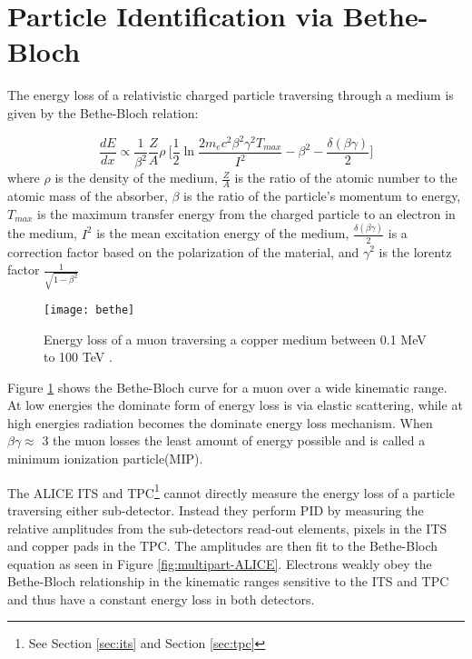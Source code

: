 \section{Particle Identification via Bethe-Bloch}\label{ref:pid}


The energy loss of a relativistic charged particle traversing through a medium is given by the Bethe-Bloch relation:

\begin{equation}
\frac{dE}{dx} \propto \frac{1}{\beta^{2}} \frac{Z}{A} \rho \  \bigg[ \frac{1}{2} \ln \frac{2 m_{e} c^{2} \beta^{2} \gamma^{2} T_{max}}{I^{2}} - \beta^{2} - \frac{\delta \left( \beta \gamma \right) }{2} \bigg]
\end{equation}
\noindent
where $\rho$ is the density of the medium, $\frac{Z}{A}$ is the ratio of the atomic number to the atomic mass of the absorber, $\beta$ is the ratio of the particle's momentum to energy, $T_{max}$ is the maximum transfer energy from the charged particle to an electron in the medium,  $I^{2}$ is the mean excitation energy of the medium, $\frac{\delta \left( \beta \gamma \right) }{2}$ is a correction factor based on the polarization of the material, and $\gamma^{2}$ is the lorentz factor $\frac{1}{\sqrt{1-\beta^{2}}}$

\begin{figure}[h]
\texttt{[image: bethe]}
\centering
\caption{ Energy loss of a muon traversing a copper medium between 0.1 MeV to 100 TeV \cite{Patrignani:2016xqp}.}
\label{fig:rawBB}
\end{figure}

Figure \ref{fig:rawBB} shows the Bethe-Bloch curve for a muon over a wide kinematic range.  At low energies the dominate form of energy loss is via elastic scattering, while at high energies radiation becomes the dominate energy loss mechanism. When $\beta \gamma \approx$ 3 the muon losses the least amount of energy possible and is called a minimum ionization particle(MIP).  

The ALICE ITS and TPC\footnote{See Section \ref{sec:its} and Section \ref{sec:tpc}} cannot directly measure the energy loss of a particle traversing either sub-detector.  Instead they perform PID by measuring the relative amplitudes from the sub-detectors read-out elements, pixels in the ITS and copper pads in the TPC.  The amplitudes are then fit to the Bethe-Bloch equation as seen in Figure \ref{fig:multipart-ALICE}.  Electrons weakly obey the Bethe-Bloch relationship in the kinematic ranges sensitive to the ITS and TPC and thus have a constant energy loss in both detectors.

